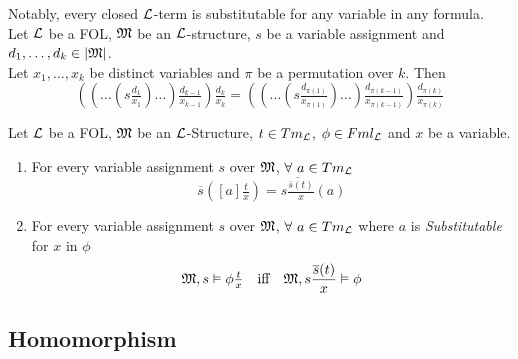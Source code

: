 \documentclass[11pt,a4paper]{article}
\begin{document}


Notably, every closed $\mathcal{L}$-term is substitutable for any variable in any formula.\\

Let $\mathcal{L}$ be a FOL, $\mathfrak{M}$ be an $\mathcal{L}$-structure, $s$ be a variable assignment and $d_1,\dots,d_k\in|\mathfrak{M}|$.\\
Let $x_1,\dots,x_k$ be distinct variables and $\pi$ be a permutation over $k$. Then
$$\left(\left(\dots\left(s\tfrac{d_1}{x_1}\right)\dots\right)\tfrac{d_{k-1}}{x_{k-1}}\right)\tfrac{d_k}{x_k}=\left(\left(\dots\left(s\tfrac{d_{\pi(1)}}{x_{\pi(1)}}\right)\dots\right)\tfrac{d_{\pi(k-1)}}{x_{\pi(k-1)}}\right)\tfrac{d_{\pi(k)}}{x_{\pi(k)}}$$

Let $\mathcal{L}$ be a FOL, $\mathfrak{M}$ be an $\mathcal{L}$-Structure, $t\in Tm_{\mathcal{L}}$, $\phi\in Fml_{\mathcal{L}}$ and $x$ be a variable.\begin{enumerate}
	\item For every variable assignment $s$ over $\mathfrak{M}$, $\forall\ a\in Tm_{\mathcal{L}}$
	$$\overline{s}\left([a]\tfrac{t}x\right)=\overline{s\tfrac{\overline{s}(t)}x}(a)$$
	\item For every variable assignment $s$ over $\mathfrak{M}$, $\forall\ a\in Tm_{\mathcal{L}}$ where $a$ is \textit{Substitutable} for $x$ in $\phi$
	$$\mathfrak{M},s\vDash\phi\tfrac{t}x\quad\text{iff}\quad\mathfrak{M},s\frac{\overline{s}(t)}x\vDash\phi$$
\end{enumerate}



\subsection{Homomorphism}
\end{document}
